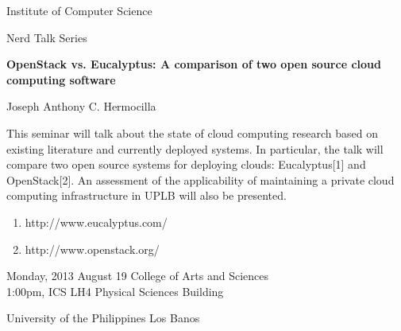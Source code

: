 \documentclass[12pt]{article}
\begin{document}
\baselineskip 24pt

\parindent 0.0cm


\begin{center}

{\rm \Huge{Institute of Computer Science}}

\bigskip

{\rm \Large Nerd Talk Series}

\end{center}

\smallskip

\hspace*{-1cm}
\framebox[16.5cm]{\rule[-.5cm]{0cm}{15cm} }

\vspace*{ -15cm}

\begin{center}
{\rm \Huge

\textbf{OpenStack vs. Eucalyptus: A comparison of two open source cloud computing software}

\bigskip
\bigskip
Joseph Anthony C. Hermocilla 
}

\end{center}

\vfill

\baselineskip 15pt
\Large{
This seminar will talk about the state of cloud computing research based on existing literature and currently deployed systems.
In particular, the talk will compare two open source systems for deploying clouds: Eucalyptus[1] and OpenStack[2]. An assessment of the
applicability of maintaining a private cloud computing infrastructure in UPLB will also be presented.
}
\medskip

\baselineskip 12pt

{\small
\begin{enumerate}
\item http://www.eucalyptus.com/
\item http://www.openstack.org/
\end{enumerate}
}


\baselineskip 24pt

\vfill



{\rm \Large 
Monday, 2013 August 19    \hfill           College of Arts and Sciences\\ 
1:00pm, ICS LH4                   \hfill  Physical Sciences Building\\
\centerline       {University of the Philippines Los Banos}
}
\end{document}
